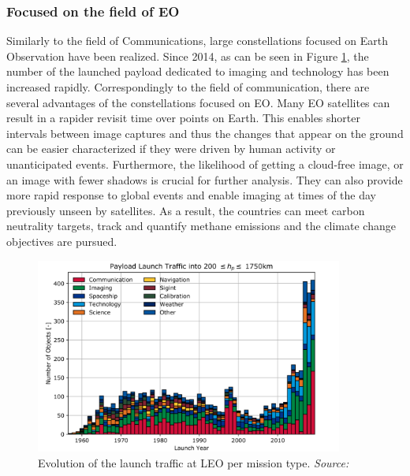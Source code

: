 \subsubsection{Focused on the field of EO}
\bigskip
Similarly to the field of Communications, large constellations focused on Earth Observation have been realized. Since 2014, as can be seen in Figure \ref{launch_traffic_type_LEO}, the number of the launched payload dedicated to imaging and technology has been increased rapidly. Correspondingly to the field of communication, there are several advantages of the constellations focused on EO. Many EO satellites can result in a rapider revisit time over points on Earth. This enables shorter intervals between image captures and thus the changes that appear on the ground can be easier characterized if they were driven by human activity or unanticipated events. Furthermore, the likelihood of getting a cloud-free image, or an image with fewer shadows is crucial for further analysis. They can also provide more rapid response to global events and enable imaging at times of the day previously unseen by satellites. As a result, the countries can meet carbon neutrality targets, track and quantify methane emissions and the climate change objectives are pursued. \cite{LE_Esteve} %

\begin{figure}
\centering
\includegraphics[width=0.9\textwidth]{Images/launch_traffic_type_LEO.png}\caption{Evolution of the launch traffic at LEO per mission type. \textit{Source: \cite{ESA 2020}}}
\label{launch_traffic_type_LEO} 
\end{figure} 

